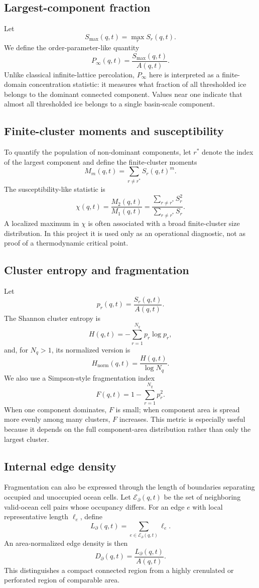 \documentclass[11pt]{article}
\begin{document}
\subsection{Largest-component fraction}
Let
\[
S_{\max}(q,t)=\max_r S_r(q,t).
\]
We define the order-parameter-like quantity
\[
P_\infty(q,t)=\frac{S_{\max}(q,t)}{A(q,t)}.
\]
Unlike classical infinite-lattice percolation, $P_\infty$ here is interpreted as a finite-domain concentration statistic: it measures what fraction of all thresholded ice belongs to the dominant connected component. Values near one indicate that almost all thresholded ice belongs to a single basin-scale component.

\subsection{Finite-cluster moments and susceptibility}
To quantify the population of non-dominant components, let $r^*$ denote the index of the largest component and define the finite-cluster moments
\[
M_m(q,t)=\sum_{r\neq r^*} S_r(q,t)^m.
\]
The susceptibility-like statistic is
\[
\chi(q,t)=\frac{M_2(q,t)}{M_1(q,t)}
=\frac{\sum_{r\neq r^*}S_r^2}{\sum_{r\neq r^*}S_r}.
\]
A localized maximum in $\chi$ is often associated with a broad finite-cluster size distribution. In this project it is used only as an operational diagnostic, not as proof of a thermodynamic critical point.

\subsection{Cluster entropy and fragmentation}
Let
\[
p_r(q,t)=\frac{S_r(q,t)}{A(q,t)}.
\]
The Shannon cluster entropy is
\[
H(q,t)=-\sum_{r=1}^{N_q}p_r\log p_r,
\]
and, for $N_q>1$, its normalized version is
\[
H_{\mathrm{norm}}(q,t)=\frac{H(q,t)}{\log N_q}.
\]
We also use a Simpson-style fragmentation index
\[
F(q,t)=1-\sum_{r=1}^{N_q}p_r^2.
\]
When one component dominates, $F$ is small; when component area is spread more evenly among many clusters, $F$ increases. This metric is especially useful because it depends on the full component-area distribution rather than only the largest cluster.

\subsection{Internal edge density}
Fragmentation can also be expressed through the length of boundaries separating occupied and unoccupied ocean cells. Let $\mathcal E_{\partial}(q,t)$ be the set of neighboring valid-ocean cell pairs whose occupancy differs. For an edge $e$ with local representative length $\ell_e$, define
\[
L_{\partial}(q,t)=\sum_{e\in\mathcal E_{\partial}(q,t)}\ell_e.
\]
An area-normalized edge density is then
\[
D_{\partial}(q,t)=\frac{L_{\partial}(q,t)}{A(q,t)}.
\]
This distinguishes a compact connected region from a highly crenulated or perforated region of comparable area.
\end{document}
